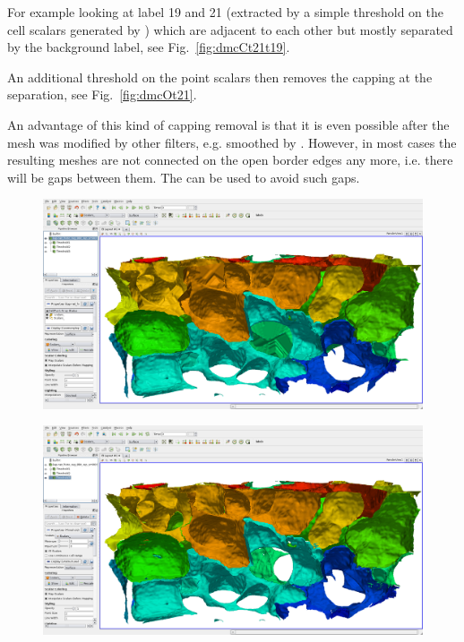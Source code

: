 \documentclass{InsightArticle}
\begin{document}
For example looking at label 19 and 21 (extracted by a simple threshold on the cell scalars generated by ) which are adjacent to each other but mostly separated by the background label, see Fig.~\ref{fig:dmcCt21t19}.

An additional threshold on the point scalars then removes the capping at the separation, see Fig.~\ref{fig:dmcOt21}.

An advantage of this kind of capping removal is that it is even possible after the mesh was modified by other filters, e.g. smoothed by . However, in most cases the resulting meshes are not connected on the open border edges any more, i.e. there will be gaps between them. The \citep{Grothausmann2014_r} can be used to avoid such gaps.



\begin{figure}
\center
\includegraphics[width=\textwidth]{images/vtkDiscreteMarchingCubes_extension_01}
\label{fig:dmcC}
\end{figure}

\begin{figure}
\center
\includegraphics[width=\textwidth]{images/vtkDiscreteMarchingCubes_extension_02}
\label{fig:dmcO}
\end{figure}
\end{document}
